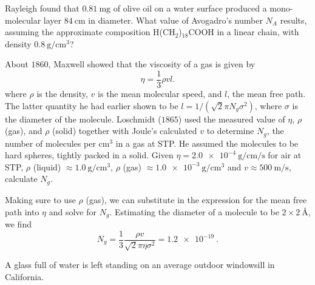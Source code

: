 \documentclass[../feynman-lectures-on-physics.tex]{subfiles}
\begin{document}
\begin{questions}
\begin{solution}
\end{solution}

\question Rayleigh found that $\SI{0.81}{\milli\gram}$ of olive oil on a water surface produced a mono-molecular layer $\SI{84}{\centi\meter}$ in diameter. What value of Avogadro's number $N_A$ results, assuming the approximate composition H(CH$_2$)$_{18}$COOH in a linear chain, with density $\SI{0.8}{\gram\per\centi\meter\cubed}$?

\question About $1860$, Maxwell showed that the viscosity of a gas is given by
\[
\eta = \frac{1}{3}\rho{vl}
.\] 
where $\rho$ is the density, $v$ is the mean molecular speed, and $l$, the mean free path. The latter quantity he had earlier shown to be $l = 1/(\sqrt{2}\pi{N_g}\sigma^2)$, where $\sigma$ is the diameter of the molecule. Loschmidt ($1865$) used the measured value of $\eta$, $\rho$ (gas), and $\rho$ (solid) together with Joule's calculated $v$ to determine $N_g$, the number of molecules per cm$^{3}$ in a gas at STP. He assumed the molecules to be hard spheres, tightly packed in a solid. Given $\eta = \SI{2.0e-4}{\gram\per\centi\meter\per\second}$ for air at STP, $\rho$ (liquid) $\approx \SI{1.0}{\gram\per\centi\meter\cubed}$, $\rho$ (gas) $\approx \SI{1.0e-3}{\gram\per\centi\meter\cubed}$ and $v \approx \SI{500}{\meter\per\second}$, calculate $N_g$.

\begin{solution}
	Making sure to use $\rho$ (gas), we can substitute in the expression for the mean free path into $\eta$ and solve for $N_g$. Estimating the diameter of a molecule to be $2\times\SI{2}{\angstrom}$, we find
	\[
	N_g = \frac{1}{3}\frac{\rho{v}}{\sqrt{2}\pi\eta\sigma^2} = \SI{1.2e-19}{}
	.\] 
\end{solution}

\question A glass full of water is left standing on an average outdoor windowsill in California.
\end{questions}
\end{document}
